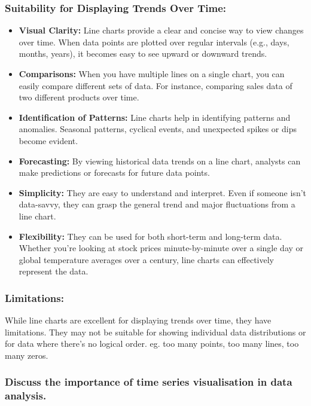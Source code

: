 \documentclass{article}\usepackage[]{graphicx}\usepackage[]{xcolor}
\begin{document}
\subsubsection{Suitability for Displaying Trends Over Time:}
\begin{itemize}
    \item \textbf{Visual Clarity:} Line charts provide a clear and concise way to view changes over time. When data points are plotted over regular intervals (e.g., days, months, years), it becomes easy to see upward or downward trends.
    \item \textbf{Comparisons:} When you have multiple lines on a single chart, you can easily compare different sets of data. For instance, comparing sales data of two different products over time.
    \item \textbf{Identification of Patterns:} Line charts help in identifying patterns and anomalies. Seasonal patterns, cyclical events, and unexpected spikes or dips become evident.
    \item \textbf{Forecasting:} By viewing historical data trends on a line chart, analysts can make predictions or forecasts for future data points.
    \item \textbf{Simplicity:} They are easy to understand and interpret. Even if someone isn't data-savvy, they can grasp the general trend and major fluctuations from a line chart.
    \item \textbf{Flexibility:} They can be used for both short-term and long-term data. Whether you're looking at stock prices minute-by-minute over a single day or global temperature averages over a century, line charts can effectively represent the data.
\end{itemize}


\subsubsection{Limitations:}
While line charts are excellent for displaying trends over time, they have limitations. They may not be suitable for showing individual data distributions or for data where there's no logical order. eg. too many points, too many lines, too many zeros.\\


\subsubsection{Discuss the importance of time series visualisation in data analysis.}
\end{document}
